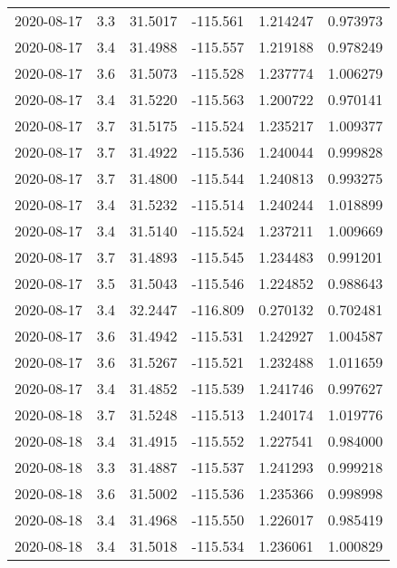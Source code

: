 \begin{tabular}{lrrrrr}
2020-08-17 &       3.3 &  31.5017 &  -115.561 &         1.214247 &         0.973973 \\
2020-08-17 &       3.4 &  31.4988 &  -115.557 &         1.219188 &         0.978249 \\
2020-08-17 &       3.6 &  31.5073 &  -115.528 &         1.237774 &         1.006279 \\
2020-08-17 &       3.4 &  31.5220 &  -115.563 &         1.200722 &         0.970141 \\
2020-08-17 &       3.7 &  31.5175 &  -115.524 &         1.235217 &         1.009377 \\
2020-08-17 &       3.7 &  31.4922 &  -115.536 &         1.240044 &         0.999828 \\
2020-08-17 &       3.7 &  31.4800 &  -115.544 &         1.240813 &         0.993275 \\
2020-08-17 &       3.4 &  31.5232 &  -115.514 &         1.240244 &         1.018899 \\
2020-08-17 &       3.4 &  31.5140 &  -115.524 &         1.237211 &         1.009669 \\
2020-08-17 &       3.7 &  31.4893 &  -115.545 &         1.234483 &         0.991201 \\
2020-08-17 &       3.5 &  31.5043 &  -115.546 &         1.224852 &         0.988643 \\
2020-08-17 &       3.4 &  32.2447 &  -116.809 &         0.270132 &         0.702481 \\
2020-08-17 &       3.6 &  31.4942 &  -115.531 &         1.242927 &         1.004587 \\
2020-08-17 &       3.6 &  31.5267 &  -115.521 &         1.232488 &         1.011659 \\
2020-08-17 &       3.4 &  31.4852 &  -115.539 &         1.241746 &         0.997627 \\
2020-08-18 &       3.7 &  31.5248 &  -115.513 &         1.240174 &         1.019776 \\
2020-08-18 &       3.4 &  31.4915 &  -115.552 &         1.227541 &         0.984000 \\
2020-08-18 &       3.3 &  31.4887 &  -115.537 &         1.241293 &         0.999218 \\
2020-08-18 &       3.6 &  31.5002 &  -115.536 &         1.235366 &         0.998998 \\
2020-08-18 &       3.4 &  31.4968 &  -115.550 &         1.226017 &         0.985419 \\
2020-08-18 &       3.4 &  31.5018 &  -115.534 &         1.236061 &         1.000829 \\

\end{tabular}
